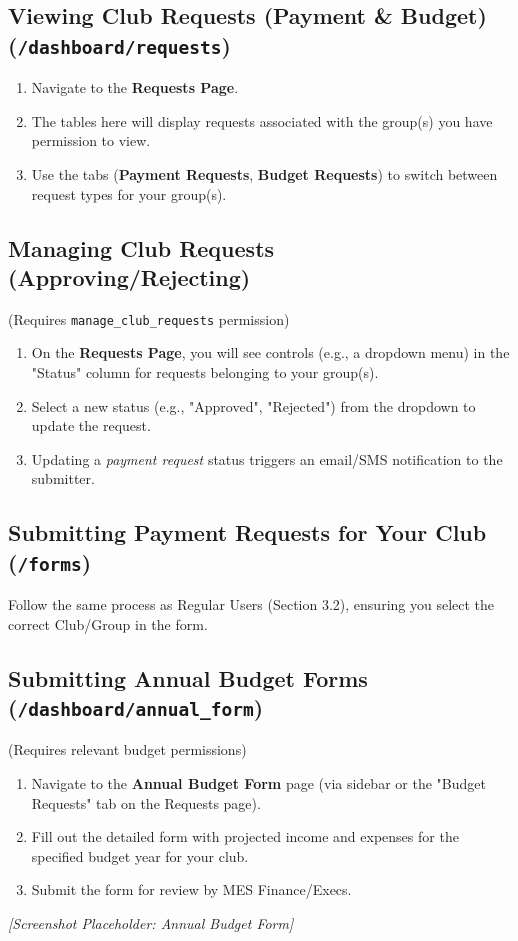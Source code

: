 \documentclass{article}
\begin{document}
\subsection{Viewing Club Requests (Payment \& Budget) (\texttt{/dashboard/requests})}
\begin{enumerate}
    \item Navigate to the \textbf{Requests Page}.
    \item The tables here will display requests associated with the group(s) you have permission to view.
    \item Use the tabs (\textbf{Payment Requests}, \textbf{Budget Requests}) to switch between request types for your group(s).
\end{enumerate}

\subsection{Managing Club Requests (Approving/Rejecting)}
(Requires \texttt{manage\_club\_requests} permission)
\begin{enumerate}
    \item On the \textbf{Requests Page}, you will see controls (e.g., a dropdown menu) in the "Status" column for requests belonging to your group(s).
    \item Select a new status (e.g., "Approved", "Rejected") from the dropdown to update the request.
    \item Updating a \textit{payment request} status triggers an email/SMS notification to the submitter.
\end{enumerate}

\subsection{Submitting Payment Requests for Your Club (\texttt{/forms})}
Follow the same process as Regular Users (Section 3.2), ensuring you select the correct Club/Group in the form.

\subsection{Submitting Annual Budget Forms (\texttt{/dashboard/annual\_form})}
(Requires relevant budget permissions)
\begin{enumerate}
    \item Navigate to the \textbf{Annual Budget Form} page (via sidebar or the "Budget Requests" tab on the Requests page).
    \item Fill out the detailed form with projected income and expenses for the specified budget year for your club.
    \item Submit the form for review by MES Finance/Execs.
\end{enumerate}
\textit{[Screenshot Placeholder: Annual Budget Form]}
\end{document}
